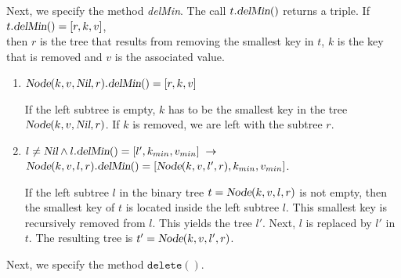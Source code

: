 Next, we specify the  method \textsl{delMin}.  The call $t.\textsl{delMin}()$ returns a triple.
If 
\\[0.2cm]
\hspace*{1.3cm}
$t.\textsl{delMin}() = [r,k,v]$,
\\[0.2cm]
then $r$ is the tree that  results from
removing the smallest key in $t$, $k$ is the key that is removed and $v$ is the associated value.
\begin{enumerate}
\item $\textsl{Node}(k, v, \textsl{Nil}, r).\textsl{delMin}() = [r, k, v]$

      If the left subtree is empty, $k$ has to be the smallest key in the tree 
      $\textsl{Node}(k, v, \textsl{Nil}, r)$.  If $k$ is removed, we are left with the subtree $r$.
\item $l\not= \textsl{Nil} \wedge l.\textsl{delMin}() = [l',k_{min}, v_{min}] \;\rightarrow$ \\[0.2cm]
       \hspace*{1.3cm} 
       $\textsl{Node}(k, v, l, r).\textsl{delMin}() = [\textsl{Node}(k, v, l', r), k_{min}, v_{min}]$.

      If the left subtree $l$ in the binary tree $t = \textsl{Node}(k, v, l, r)$
      is not empty, then the smallest key of  $t$ is located inside the left subtree $l$.
      This smallest key is recursively removed from  $l$. This yields the tree 
      $l'$.  Next,  $l$ is replaced by $l'$ in $t$.  The resulting tree is
      $t' = \textsl{Node}(k, v, l', r)$.
\end{enumerate}
Next, we specify the method $\mathtt{delete}()$.
